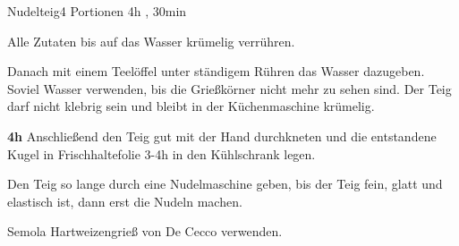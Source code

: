 \documentclass[../recipe-collections/cooking.tex]{subfiles}
\begin{document}
\begin{recipe}{Nudelteig}{4 Portionen }{4h , 30min }

  \freeform{}\textit{}


  Alle Zutaten bis auf das Wasser krümelig verrühren.


  Danach mit einem Teelöffel unter ständigem Rühren das Wasser dazugeben.
  Soviel Wasser verwenden, bis die Grießkörner nicht mehr zu sehen sind.
  Der Teig darf nicht klebrig sein und bleibt in der Küchenmaschine krümelig.

  \newstep{}\textbf{4h}
  Anschließend den Teig gut mit der Hand durchkneten und die entstandene Kugel in Frischhaltefolie 3-4h in den Kühlschrank legen.

  \newstep{}Den Teig so lange durch eine Nudelmaschine geben, bis der Teig fein, glatt und elastisch ist, dann erst die Nudeln machen.

  \freeform{}\hrulefill{}

  \freeform{}
  Semola Hartweizengrieß von De Cecco verwenden.

\end{recipe}
\end{document}
